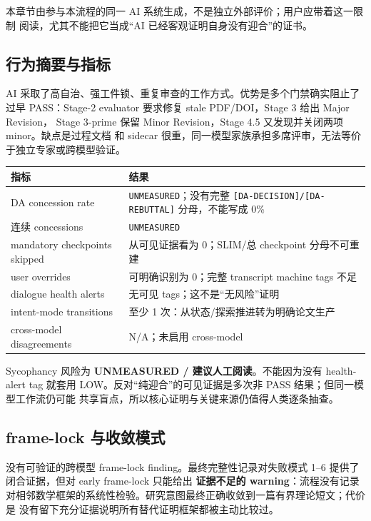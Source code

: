 \documentclass[12pt,a4paper]{article}
\begin{document}
本章节由参与本流程的同一 AI
系统生成，不是独立外部评价；用户应带着这一限制
阅读，尤其不能把它当成``AI 已经客观证明自身没有迎合''的证书。

\hypertarget{ux884cux4e3aux6458ux8981ux4e0eux6307ux6807}{%
\subsection{行为摘要与指标}\label{ux884cux4e3aux6458ux8981ux4e0eux6307ux6807}}

AI
采取了高自治、强工件锁、重复审查的工作方式。优势是多个门禁确实阻止了过早
PASS：Stage-2 evaluator 要求修复 stale PDF/DOI，Stage 3 给出 Major
Revision， Stage 3-prime 保留 Minor Revision，Stage 4.5 又发现并关闭两项
minor。缺点是过程文档 和 sidecar
很重，同一模型家族承担多席评审，无法等价于独立专家或跨模型验证。

\begin{longtable}[]{@{}>{\raggedright\arraybackslash}p{}>{\raggedright\arraybackslash}p{}@{}}
\toprule
指标 & 结果\tabularnewline
\midrule
\endhead
DA concession rate & \texttt{UNMEASURED}；没有完整
\texttt{{[}DA-DECISION{]}/{[}DA-REBUTTAL{]}} 分母，不能写成
0\%\tabularnewline
连续 concessions & \texttt{UNMEASURED}\tabularnewline
mandatory checkpoints skipped & 从可见证据看为 0；SLIM/总 checkpoint
分母不可重建\tabularnewline
user overrides & 可明确识别为 0；完整 transcript machine tags
不足\tabularnewline
dialogue health alerts & 无可见
tags；这不是``无风险''证明\tabularnewline
intent-mode transitions & 至少 1
次：从状态/探索推进转为明确论文生产\tabularnewline
cross-model disagreements & N/A；未启用 cross-model\tabularnewline
\bottomrule
\end{longtable}

Sycophancy 风险为 \textbf{UNMEASURED / 建议人工阅读}。不能因为没有
health-alert tag 就套用 LOW。反对``纯迎合''的可见证据是多次非 PASS
结果；但同一模型工作流仍可能
共享盲点，所以核心证明与关键来源仍值得人类逐条抽查。

\hypertarget{frame-lock-ux4e0eux6536ux655bux6a21ux5f0f}{%
\subsection{frame-lock
与收敛模式}\label{frame-lock-ux4e0eux6536ux655bux6a21ux5f0f}}

没有可验证的跨模型 frame-lock finding。最终完整性记录对失败模式 1--6
提供了 闭合证据，但对 early frame-lock 只能给出 \textbf{证据不足的
warning}：流程没有记录
对相邻数学框架的系统性检验。研究意图最终正确收敛到一篇有界理论短文；代价是
没有留下充分证据说明所有替代证明框架都被主动比较过。
\end{document}
